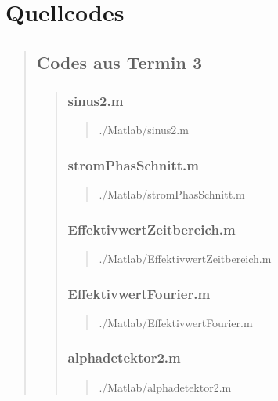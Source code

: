 \section{Quellcodes}
\begin{quote}
	
	\subsection{Codes aus Termin 3}
	\begin{quote}
	    \subsubsection{sinus2.m}
	    \begin{quote}
	        
	            {./Matlab/sinus2.m}
	    \end{quote}
    
	    \subsubsection{stromPhasSchnitt.m}
	    \begin{quote}
	        
	            {./Matlab/stromPhasSchnitt.m}
	    \end{quote}
    
	    \subsubsection{EffektivwertZeitbereich.m}
	    \begin{quote}
	        
	            {./Matlab/EffektivwertZeitbereich.m}
	    \end{quote}
    
	    \subsubsection{EffektivwertFourier.m}
	    \begin{quote}
	        
	            {./Matlab/EffektivwertFourier.m}
	    \end{quote}
	    \subsubsection{alphadetektor2.m}
        \begin{quote}
            
                {./Matlab/alphadetektor2.m}
        \end{quote}
	\end{quote}
	

\end{quote}
